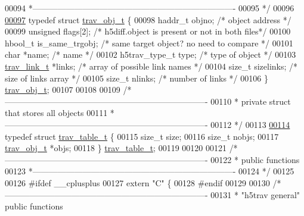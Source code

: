 \begin{DoxyCode}
00094 \textcolor{comment}{ *-------------------------------------------------------------------------}
00095 \textcolor{comment}{ */}
00096 
\hyperlink{structtrav__obj__t}{00097} \textcolor{keyword}{typedef} \textcolor{keyword}{struct }\hyperlink{structtrav__obj__t}{trav\_obj\_t} \{
00098     haddr\_t     objno;     \textcolor{comment}{/* object address */}
00099     \textcolor{keywordtype}{unsigned}    flags[2];  \textcolor{comment}{/* h5diff.object is present or not in both files*/}
00100     hbool\_t     is\_same\_trgobj; \textcolor{comment}{/* same target object? no need to compare */}
00101     \textcolor{keywordtype}{char}        *name;     \textcolor{comment}{/* name */}
00102     h5trav\_type\_t type;    \textcolor{comment}{/* type of object */}
00103     \hyperlink{structtrav__link__t}{trav\_link\_t} *links;    \textcolor{comment}{/* array of possible link names */}
00104     \textcolor{keywordtype}{size\_t}      sizelinks; \textcolor{comment}{/* size of links array */}
00105     \textcolor{keywordtype}{size\_t}      nlinks;    \textcolor{comment}{/* number of links */}
00106 \} \hyperlink{structtrav__obj__t}{trav\_obj\_t};
00107 
00108 
00109 \textcolor{comment}{/*-------------------------------------------------------------------------}
00110 \textcolor{comment}{ * private struct that stores all objects}
00111 \textcolor{comment}{ *-------------------------------------------------------------------------}
00112 \textcolor{comment}{ */}
00113 
\hyperlink{structtrav__table__t}{00114} \textcolor{keyword}{typedef} \textcolor{keyword}{struct }\hyperlink{structtrav__table__t}{trav\_table\_t} \{
00115     \textcolor{keywordtype}{size\_t}      size;
00116     \textcolor{keywordtype}{size\_t}      nobjs;
00117     \hyperlink{structtrav__obj__t}{trav\_obj\_t} *objs;
00118 \} \hyperlink{structtrav__table__t}{trav\_table\_t};
00119 
00120 
00121 \textcolor{comment}{/*-------------------------------------------------------------------------}
00122 \textcolor{comment}{ * public functions}
00123 \textcolor{comment}{ *-------------------------------------------------------------------------}
00124 \textcolor{comment}{ */}
00125 
00126 \textcolor{preprocessor}{#ifdef \_\_cplusplus}
00127 \textcolor{keyword}{extern} \textcolor{stringliteral}{"C"} \{
00128 \textcolor{preprocessor}{#endif}
00129 
00130 \textcolor{comment}{/*-------------------------------------------------------------------------}
00131 \textcolor{comment}{ * "h5trav general" public functions}

\end{DoxyCode}
